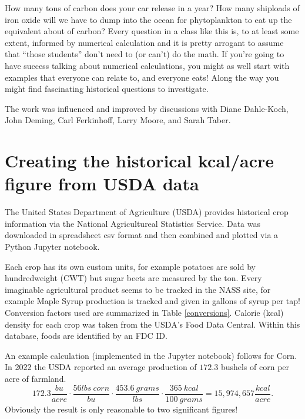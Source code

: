\documentclass[prb,preprint]{revtex4-2}
\newcommand{\be}{\begin{equation}}
\newcommand{\ee}{\end{equation}}
\begin{document}
How many tons of carbon does your car release in a year? How many shiploads of iron oxide will we have to dump into the ocean for phytoplankton to eat up the equivalent about of carbon?  Every question in a class like this is, to at least some extent, informed by numerical calculation and it is pretty arrogant to assume that ``those students'' don't need to (or can't) do the math.  If you're going to have success talking about numerical calculations, you might as well start with examples that everyone can relate to, and everyone eats!  Along the way you might find fascinating historical questions to investigate.   


\begin{acknowledgments}
The work was influenced and improved by discussions with 
Diane Dahle-Koch, 
John Deming, 
Carl Ferkinhoff, 
Larry Moore, 
and Sarah Taber.
\end{acknowledgments}

\clearpage
\appendix
\section{Creating the historical kcal/acre figure from USDA data}
\label{how_yield_plot_is_made}
The United States Department of Agriculture (USDA) provides historical crop information via the National Agricultureal Statistics Service.\cite{USDA_NASS}
Data was downloaded in spreadsheet csv format and then combined and plotted via a Python Jupyter notebook.   

Each crop has its own custom units, for example potatoes are sold by hundredweight (CWT) but sugar beets are measured by the ton.  
Every imaginable agricultural product seems to be tracked in the NASS site, for example Maple Syrup production is tracked and given in gallons of syrup per tap! 
Conversion factors used are summarized in Table \ref{conversions}.  
Calorie (kcal) density for each crop was taken from the USDA's Food Data Central.\cite{USDA_FDC}
Within this database, foods are identified by an FDC ID.  

An example calculation (implemented in the Jupyter notebook) follows for Corn.  
In 2022 the USDA reported an average production of $172.3$ bushels of corn per acre of farmland.  
\be
172.3\frac{bu}{acre}\cdot\frac{56lbs~corn}{bu}\cdot\frac{453.6~grams}{lbs}\cdot\frac{365~kcal}{100~grams} = 15,974,657 \frac{kcal}{acre} .
\label{example_calculation}
\ee
Obviously the result is only reasonable to two significant figures!
\end{document}
